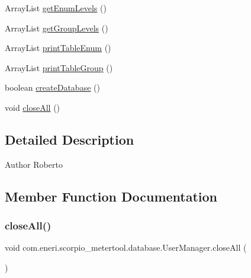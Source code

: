 \begin{DoxyCompactItemize}
\item 
Array\+List \hyperlink{classcom_1_1eneri_1_1scorpio__metertool_1_1database_1_1_user_manager_ac55cd4caf56cd113f86982cf265aaadf}{get\+Enum\+Levels} ()
\item 
Array\+List \hyperlink{classcom_1_1eneri_1_1scorpio__metertool_1_1database_1_1_user_manager_aa6bda3c31038aaba7c03cffe17be795a}{get\+Group\+Levels} ()
\item 
Array\+List \hyperlink{classcom_1_1eneri_1_1scorpio__metertool_1_1database_1_1_user_manager_a9e921613f943973caabd6946b3f9fbe8}{print\+Table\+Enum} ()
\item 
Array\+List \hyperlink{classcom_1_1eneri_1_1scorpio__metertool_1_1database_1_1_user_manager_aaf95572e44f97c67bedfc33eeadd7661}{print\+Table\+Group} ()
\item 
boolean \hyperlink{classcom_1_1eneri_1_1scorpio__metertool_1_1database_1_1_user_manager_a97d9641a5d944453b4053d9fecad5dfc}{create\+Database} ()
\item 
void \hyperlink{classcom_1_1eneri_1_1scorpio__metertool_1_1database_1_1_user_manager_aa642d3ad80d66e94eb2b01489b770ebb}{close\+All} ()
\end{DoxyCompactItemize}


\subsection{Detailed Description}
\begin{DoxyAuthor}{Author}
Roberto 
\end{DoxyAuthor}


\subsection{Member Function Documentation}
\mbox{\label{classcom_1_1eneri_1_1scorpio__metertool_1_1database_1_1_user_manager_aa642d3ad80d66e94eb2b01489b770ebb}} 
\subsubsection{\texorpdfstring{close\+All()}{closeAll()}}
{\footnotesize\ttfamily void com.\+eneri.\+scorpio\+\_\+metertool.\+database.\+User\+Manager.\+close\+All (\begin{DoxyParamCaption}{ }\end{DoxyParamCaption})}

